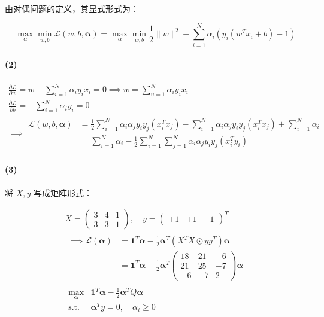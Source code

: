 \documentclass{ctexart}
\begin{document}
由对偶问题的定义，其显式形式为：

\begin{equation*}
\max_{\alpha}\min_{w,b}\mathcal L(w, b,\boldsymbol \alpha) = \max_{\alpha}\min_{w,b}\frac{1}{2}\|w\|^2-\sum_{i=1}^N\alpha_i(y_i(w^Tx_i+b)-1)
\end{equation*}


\paragraph{(2)}\label{section-1}


\begin{gather*}
\frac{\partial \mathcal L}{\partial w} = w-\sum_{i=1}^N\alpha_iy_ix_i=0\implies w=\sum_{u=1}^N\alpha_iy_ix_i\\
\frac{\partial \mathcal L}{\partial b} = -\sum_{i=1}^N\alpha_iy_i=0 \\
\implies
\begin{aligned}
\mathcal L(w, b, \boldsymbol \alpha)&=\frac{1}{2}\sum_{i=1}^N\alpha_i\alpha_jy_iy_j(x_i^Tx_j)-\sum_{i=1}^N\alpha_i\alpha_jy_iy_j(x_i^Tx_j)+\sum_{i=1}^N\alpha_i \\
&= \sum_{i=1}^N\alpha_i - \frac{1}{2}\sum_{i=1}^N\sum_{j=1}^N\alpha_i\alpha_jy_iy_j(x_i^Ty_i)
\end{aligned}
\end{gather*}


\paragraph{(3)}\label{section-2}

将 \(X,y\) 写成矩阵形式：


\begin{gather*}
X = \begin{pmatrix}
3 & 4 & 1\\
3 & 3 & 1
\end{pmatrix}, \quad
y = \begin{pmatrix}
+1&+1&-1
\end{pmatrix}^T\\
\begin{aligned}
\implies \mathcal L(\boldsymbol \alpha) &= \mathbf{1}^T\boldsymbol\alpha-\frac{1}{2}\boldsymbol \alpha^T(X^TX\odot yy^T)\boldsymbol \alpha \\
&= \mathbf{1}^T\boldsymbol\alpha-\frac{1}{2}\boldsymbol \alpha^T
\begin{pmatrix}
18 & 21 & -6\\
21 & 25 & -7\\
-6 & -7 & 2
\end{pmatrix}\boldsymbol \alpha
\end{aligned} \\
\boxed{
\begin{matrix}
\displaystyle\max_{\boldsymbol \alpha}&\displaystyle\mathbf{1}^T\boldsymbol\alpha-\frac{1}{2}\boldsymbol \alpha^TQ\boldsymbol \alpha\\
\text{s.t.} & \boldsymbol \alpha^Ty = 0, \quad \alpha_i\ge 0
\end{matrix}
}
\end{gather*}
\end{document}
